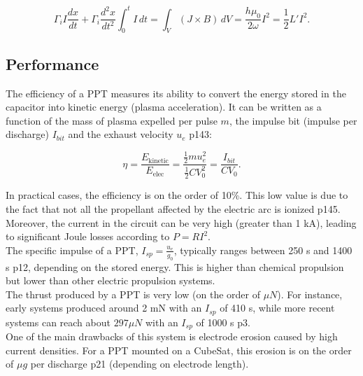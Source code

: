 \begin{equation}
\Gamma_i I \frac{dx}{dt} + \Gamma_i \frac{d^2 x}{dt^2} \int_0^t I \, dt = \int_V (J \times B) \, dV=\frac{h\mu_0}{2\omega}I^2=\frac{1}{2}L'I^2.
\end{equation}

\subsection{Performance}

The efficiency of a PPT measures its ability to convert the energy stored in the capacitor into kinetic energy (plasma acceleration). It can be written as a function of the mass of plasma expelled per pulse $m$, the impulse bit (impulse per discharge) $I_{bit}$ and the exhaust velocity $u_e$ \cite{Shaw_2011} p143:

\begin{equation}
\eta = \frac{E_{\text{kinetic}}}{E_{\text{elec}}}
= \frac{\frac{1}{2} m u_e^2}{\frac{1}{2} C V_0^2}
= \frac{I_{bit}}{C V_0}.
\end{equation}


In practical cases, the efficiency is on the order of 10\%. This low value is due to the fact that not all the propellant affected by the electric arc is ionized \cite{Shaw_2011} p145. Moreover, the current in the circuit can be very high (greater than 1 kA), leading to significant Joule losses according to $P = R I^2$.
\\[0.4cm]

The specific impulse of a PPT, $I_{sp} = \frac{u_e}{g_0}$, typically ranges between 250 s and 1400 s \cite{Shaw_2011} p12, depending on the stored energy. This is higher than chemical propulsion but lower than other electric propulsion systems.
\\[0.4cm]

The thrust produced by a PPT is very low (on the order of $\mu N$). For instance, early systems produced around 2 mN with an $I_{sp}$ of 410 s, while more recent systems can reach about $297 \mu N$ with an $I_{sp}$ of 1000 s \cite{Grand_2021} p3.
\\[0.4cm]

One of the main drawbacks of this system is electrode erosion caused by high current densities. For a PPT mounted on a CubeSat, this erosion is on the order of $\mu g$ per discharge \cite{Shaw_2011} p21 (depending on electrode length).
